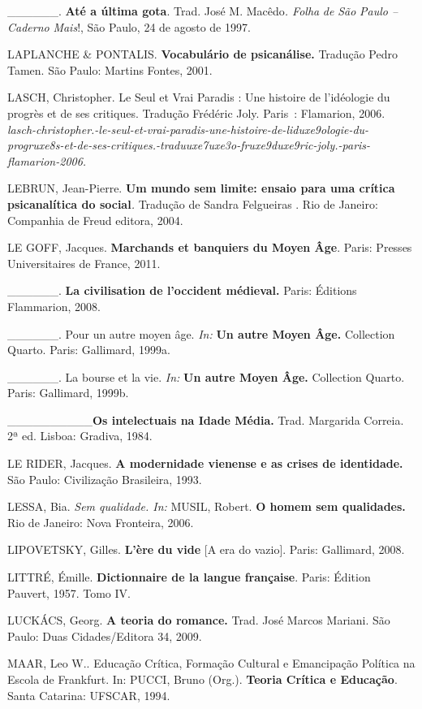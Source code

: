 \_\_\_\_\_\_. \textbf{Até a última gota}. Trad. José M. Macêdo\emph{.
Folha} \emph{de} \emph{São} \emph{Paulo -- Caderno} \emph{Mais}!, São
Paulo, 24 de agosto de 1997.

LAPLANCHE \& PONTALIS. \textbf{Vocabulário de psicanálise.} Tradução
Pedro Tamen. São Paulo: Martins Fontes, 2001.

LASCH, Christopher. Le Seul et Vrai Paradis : Une histoire de
l'idéologie du progrès et de ses critiques. Tradução Frédéric Joly.
Paris~: Flamarion,
2006. \emph{lasch-christopher.-le-seul-et-vrai-paradis-une-histoire-de-liduxe9ologie-du-progruxe8s-et-de-ses-critiques.-traduuxe7uxe3o-fruxe9duxe9ric-joly.-paris-flamarion-2006.}

LEBRUN, Jean-Pierre. \textbf{Um mundo sem limite: ensaio para uma
crítica psicanalítica do social}\emph{.} Tradução de Sandra Felgueiras .
Rio de Janeiro: Companhia de Freud editora, 2004.

LE GOFF, Jacques. \textbf{Marchands et banquiers du Moyen Âge}. Paris:
Presses Universitaires de France, 2011.

\_\_\_\_\_\_. \textbf{La civilisation de l'occident médieval.} Paris:
Éditions Flammarion, 2008.

\_\_\_\_\_\_. Pour un autre moyen âge. \emph{In:} \textbf{Un autre Moyen
Âge.} Collection Quarto. Paris: Gallimard, 1999a.

\_\_\_\_\_\_. La bourse et la vie. \emph{In:} \textbf{Un autre Moyen
Âge.} Collection Quarto. Paris: Gallimard, 1999b.

\_\_\_\_\_\_\_\_\_\_\textbf{Os intelectuais na Idade Média.} Trad.
Margarida Correia. 2ª ed. Lisboa: Gradiva, 1984.

LE RIDER, Jacques. \textbf{A modernidade vienense e as crises de
identidade.} São Paulo: Civilização Brasileira, 1993.

LESSA, Bia. \emph{Sem qualidade. In:} MUSIL, Robert. \textbf{O homem sem
qualidades.} Rio de Janeiro: Nova Fronteira, 2006.

LIPOVETSKY, Gilles. \textbf{L'ère du vide} {[}A era do vazio{]}. Paris:
Gallimard, 2008.

LITTRÉ, Émille. \textbf{Dictionnaire de la langue française}. Paris:
Édition Pauvert, 1957. Tomo IV.

LUCKÁCS, Georg. \textbf{A teoria do romance.} Trad. José Marcos Mariani.
São Paulo: Duas Cidades/Editora 34, 2009.

MAAR, Leo W.. Educação Crítica, Formação Cultural e Emancipação Política
na Escola de Frankfurt. In: PUCCI, Bruno (Org.). \textbf{Teoria Crítica
e Educação}. Santa Catarina: UFSCAR, 1994.

